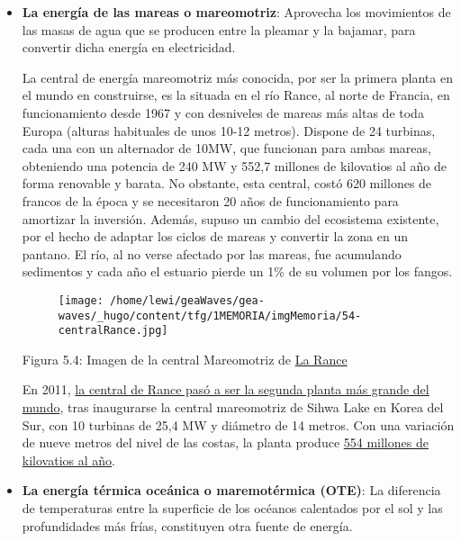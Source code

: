 \begin{itemize}
\item
  \textbf{La energía de las mareas o mareomotriz}: Aprovecha los
  movimientos de las masas de agua que se producen entre la pleamar y la
  bajamar, para convertir dicha energía en electricidad.

  La central de energía mareomotriz más conocida, por ser la primera
  planta en el mundo en construirse, es la situada en el río Rance, al
  norte de Francia, en funcionamiento desde 1967 y con desniveles de
  mareas más altas de toda Europa (alturas habituales de unos 10-12
  metros). Dispone de 24 turbinas, cada una con un alternador de 10MW,
  que funcionan para ambas mareas, obteniendo una potencia de 240 MW y
  552,7 millones de kilovatios al año de forma renovable y barata. No
  obstante, esta central, costó 620 millones de francos de la época y se
  necesitaron 20 años de funcionamiento para amortizar la inversión.
  Además, supuso un cambio del ecosistema existente, por el hecho de
  adaptar los ciclos de mareas y convertir la zona en un pantano. El
  río, al no verse afectado por las mareas, fue acumulando sedimentos y
  cada año el estuario pierde un 1\% de su volumen por los fangos.

  \begin{figure}
  \centering
  \texttt{[image: /home/lewi/geaWaves/gea-waves/\_hugo/content/tfg/1MEMORIA/imgMemoria/54-centralRance.jpg]}
  \caption{}
  \end{figure}

  Figura 5.4: Imagen de la central Mareomotriz de
  \href{http://ireneu.blogspot.com.es/2014/07/la-ecologica-y-desastrosa-central.html}{La
  Rance}

  En 2011,
  \href{https://www.blogenergiasostenible.com/central-energia-mareomotriz-rance-mas-grande-mundo/}{la
  central de Rance pasó a ser la segunda planta más grande del mundo},
  tras inaugurarse la central mareomotriz de Sihwa Lake en Korea del
  Sur, con 10 turbinas de 25,4 MW y diámetro de 14 metros. Con una
  variación de nueve metros del nivel de las costas, la planta produce
  \href{http://world.kbs.co.kr/spanish/archive/program/news_issue.htm?no=22473}{554
  millones de kilovatios al año}. 
\item
  \textbf{La energía térmica oceánica o maremotérmica (OTE)}: La
  diferencia de temperaturas entre la superficie de los océanos
  calentados por el sol y las profundidades más frías, constituyen otra
  fuente de energía.


\end{itemize}
